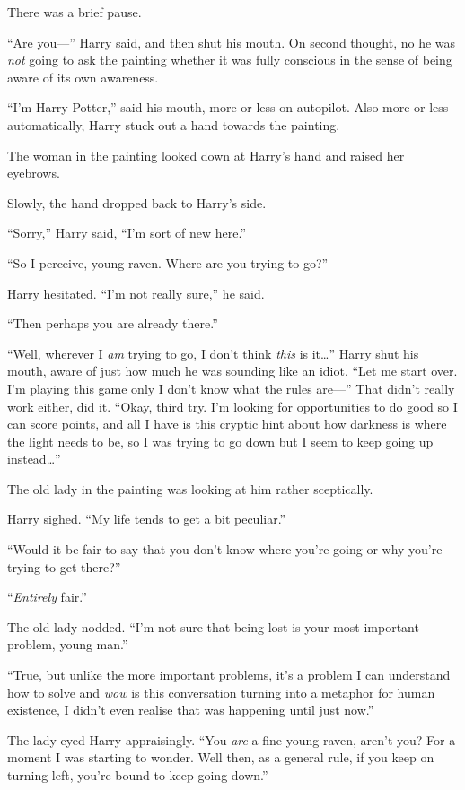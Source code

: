 There was a brief pause.

“Are you—” Harry said, and then shut his mouth. On second thought, no he was \emph{not} going to ask the painting whether it was fully conscious in the sense of being aware of its own awareness.

“I’m Harry Potter,” said his mouth, more or less on autopilot. Also more or less automatically, Harry stuck out a hand towards the painting.

The woman in the painting looked down at Harry’s hand and raised her eyebrows.

Slowly, the hand dropped back to Harry’s side.

“Sorry,” Harry said, “I’m sort of new here.”

“So I perceive, young raven. Where are you trying to go?”

Harry hesitated. “I’m not really sure,” he said.

“Then perhaps you are already there.”

“Well, wherever I \emph{am} trying to go, I don’t think \emph{this} is it…” Harry shut his mouth, aware of just how much he was sounding like an idiot. “Let me start over. I’m playing this game only I don’t know what the rules are—” That didn’t really work either, did it. “Okay, third try. I’m looking for opportunities to do good so I can score points, and all I have is this cryptic hint about how darkness is where the light needs to be, so I was trying to go down but I seem to keep going up instead…”

The old lady in the painting was looking at him rather sceptically.

Harry sighed. “My life tends to get a bit peculiar.”

“Would it be fair to say that you don’t know where you’re going or why you’re trying to get there?”

“\emph{Entirely} fair.”

The old lady nodded. “I’m not sure that being lost is your most important problem, young man.”

“True, but unlike the more important problems, it’s a problem I can understand how to solve and \emph{wow} is this conversation turning into a metaphor for human existence, I didn’t even realise that was happening until just now.”

The lady eyed Harry appraisingly. “You \emph{are} a fine young raven, aren’t you? For a moment I was starting to wonder. Well then, as a general rule, if you keep on turning left, you’re bound to keep going down.”

